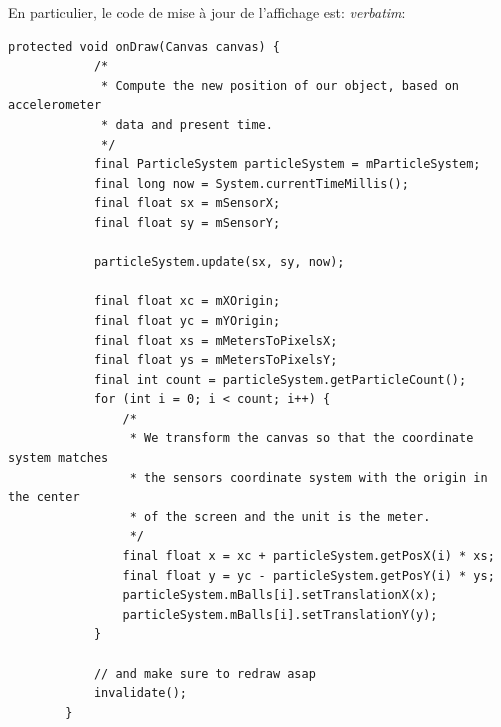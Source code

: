 \documentclass{article}
\begin{document}
En particulier, le code de mise à jour de l'affichage est:
\textit{verbatim}:
\begin{verbatim}
protected void onDraw(Canvas canvas) {
            /*
             * Compute the new position of our object, based on accelerometer
             * data and present time.
             */
            final ParticleSystem particleSystem = mParticleSystem;
            final long now = System.currentTimeMillis();
            final float sx = mSensorX;
            final float sy = mSensorY;

            particleSystem.update(sx, sy, now);

            final float xc = mXOrigin;
            final float yc = mYOrigin;
            final float xs = mMetersToPixelsX;
            final float ys = mMetersToPixelsY;
            final int count = particleSystem.getParticleCount();
            for (int i = 0; i < count; i++) {
                /*
                 * We transform the canvas so that the coordinate system matches
                 * the sensors coordinate system with the origin in the center
                 * of the screen and the unit is the meter.
                 */
                final float x = xc + particleSystem.getPosX(i) * xs;
                final float y = yc - particleSystem.getPosY(i) * ys;
                particleSystem.mBalls[i].setTranslationX(x);
                particleSystem.mBalls[i].setTranslationY(y);
            }

            // and make sure to redraw asap
            invalidate();
        }
\end{verbatim}
\end{document}
